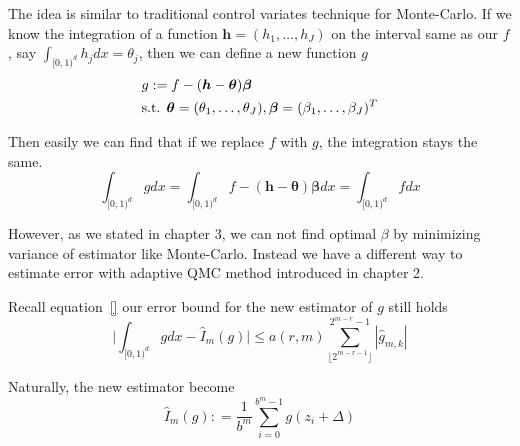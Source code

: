 

The idea is similar to traditional control variates technique for Monte-Carlo.
If we know the integration of a function $\boldsymbol{h}=(h_1,\dots,h_J)$ on the interval same as our $f$, say $\int_{[0,1)^d}h_jdx=\theta_j$, then we can define a new function $g$
\begin{align}\label{eq:defg}
    & g:=f-(\boldsymbol{h}-\boldsymbol{\theta})\boldsymbol{\beta}\\
    \notag
    &\text{s.t. }\boldsymbol{\theta}=(\theta_1,\dots,\theta_J),
    \boldsymbol{\beta}=(\beta_1,\dots,\beta_J)^T
\end{align}

Then easily we can find that if we replace $f$ with $g$, the integration stays the same.
\[
	\int_{[0,1)^d}gdx
        =\int_{[0,1)^d}f-(\boldsymbol{h}-\boldsymbol{\theta})\boldsymbol{\beta}dx
			=\int_{[0,1)^d}fdx
\]

However, as we stated in chapter 3, we can not find optimal $\beta$ by minimizing variance of estimator like Monte-Carlo. Instead we have a different way to estimate error with adaptive QMC method introduced in chapter 2.

Recall equation~\eqref{} our error bound for the new estimator of $g$ still holds
\begin{equation}\label{eq:qmccvErr}
	\Big|\int_{[0,1)^d}gdx - \hat{I}_m(g)\Big| \leq a(r,m) \sum_{\lfloor 2^{m-r-1} \rfloor}^{2^{m-r}-1} |\hat{g}_{m,k}|
\end{equation}

Naturally, the new estimator become
\begin{equation}\label{eq:estcv}
    \hat{I}_m({g}): = \frac{1}{b^m}\sum_{i=0}^{b^m-1}g(z_i+\Delta)
\end{equation}


